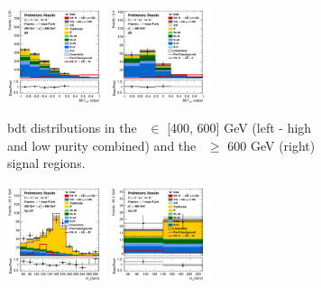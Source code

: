 \vspace*{\fill}
\begin{figure}[h!]
    \centering
    \begin{subfigure}[b]{\textwidth}
        \centering
        \includegraphics[width=0.32\textwidth]{Images/VH/Own_fit/postfit_VHbb/Region_distmva_BMax600_BMin400_incFat1_Fat1_DSRnoaddbjetsr_J0_TTypebb_incJet1_T2_L0_Y6051_GlobalFit_conditionnal_mu1.png}
        \includegraphics[width=0.32\textwidth]{Images/VH/Own_fit/postfit_VHbb/Region_distmva_BMin600_incFat1_Fat1_DSRnoaddbjetsr_J0_TTypebb_incJet1_T2_L0_Y6051_GlobalFit_conditionnal_mu1.png}
        \caption{\gls{bdt} distributions in the \ptv\ $\in$ [400, 600] GeV (left - high and low purity combined) and the \ptv\ $\geq$ 600 GeV (right) signal regions.}
        \label{fig:plots_VHbbBoost_OL_SR}
    \end{subfigure}
    \begin{subfigure}[b]{\textwidth}
        \centering
        \includegraphics[width=0.32\textwidth]{Images/VH/Own_fit/postfit_VHbb/Region_distmBB_BMax600_BMin400_incFat1_Fat1_DSRtopaddbjetcr_J0_TTypebb_incJet1_T2_L0_Y6051_GlobalFit_conditionnal_mu1.png}
        \includegraphics[width=0.32\textwidth]{Images/VH/Own_fit/postfit_VHbb/Region_distmBB_BMin600_incFat1_Fat1_DSRtopaddbjetcr_J0_TTypebb_incJet1_T2_L0_Y6051_GlobalFit_conditionnal_mu1.png}

\end{subfigure}
\end{figure}
